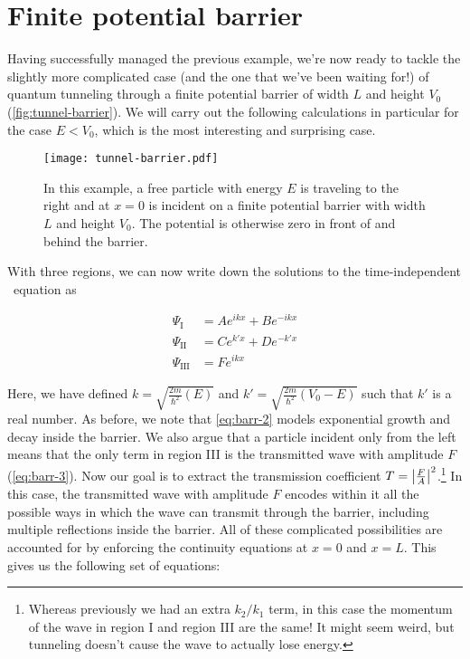\section{Finite potential barrier} \label{sec:tunnel-barrier}

Having successfully managed the previous example, we're now ready to tackle the slightly more complicated case (and the one that we've been waiting for!) of quantum tunneling through a finite potential barrier of width $L$ and height $V_0$ (\autoref{fig:tunnel-barrier}). 
We will carry out the following calculations in particular for the case $E < V_0$, which is the most interesting and surprising case.

\begin{figure}[!h]
	\centering
	\texttt{[image: tunnel-barrier.pdf]}
	\caption{In this example, a free particle with energy $E$ is traveling to the right and at $x = 0$ is incident on a finite potential barrier with width $L$ and height $V_0$. 
	The potential is otherwise zero in front of and behind the barrier.}
	\label{fig:tunnel-barrier}
\end{figure}

With three regions, we can now write down the solutions to the time-independent \Sch\ equation as

\begin{align}
	\Psi_{\text{I}} &= Ae^{ikx} + Be^{-ikx} \label{eq:barr-1} \\
	\Psi_{\text{II}} &= Ce^{k'x} + De^{-k'x} \label{eq:barr-2} \\
	\Psi_{\text{III}} &= Fe^{ikx} \label{eq:barr-3}
\end{align}

Here, we have defined $k = \sqrt{\frac{2m}{\hbar^2}(E)}$ and $k' = \sqrt{\frac{2m}{\hbar^2}(V_0 - E)}$ such that $k'$ is a real number. 
As before, we note that \autoref{eq:barr-2} models exponential growth and decay inside the barrier. 
We also argue that a particle incident only from the left means that the only term in region III is the transmitted wave with amplitude $F$ (\autoref{eq:barr-3}). 
Now our goal is to extract the transmission coefficient $T = \abs{\frac{F}{A}}^2$.\footnote{Whereas previously we had an extra $k_2/k_1$ term, in this case the momentum of the wave in region I and region III are the same! It might seem weird, but tunneling doesn't cause the wave to actually lose energy.} 
In this case, the transmitted wave with amplitude $F$ encodes within it all the possible ways in which the wave can transmit through the barrier, including multiple reflections inside the barrier. 
All of these complicated possibilities are accounted for by enforcing the continuity equations at $x = 0$ and $x = L$. 
This gives us the following set of equations:

